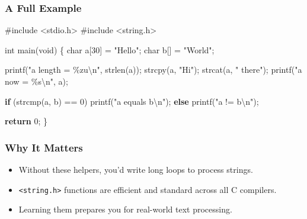 \documentclass[
  letterpaper,
  DIV=11,
  numbers=noendperiod]{scrreprt}
\newenvironment{Shaded}{\begin{snugshade}}{\end{snugshade}}
\newcommand{\ControlFlowTok}[1]{\textcolor[rgb]{0.00,0.23,0.31}{\textbf{#1}}}
\newcommand{\DataTypeTok}[1]{\textcolor[rgb]{0.68,0.00,0.00}{#1}}
\newcommand{\DecValTok}[1]{\textcolor[rgb]{0.68,0.00,0.00}{#1}}
\newcommand{\ImportTok}[1]{\textcolor[rgb]{0.00,0.46,0.62}{#1}}
\newcommand{\NormalTok}[1]{\textcolor[rgb]{0.00,0.23,0.31}{#1}}
\newcommand{\OperatorTok}[1]{\textcolor[rgb]{0.37,0.37,0.37}{#1}}
\newcommand{\PreprocessorTok}[1]{\textcolor[rgb]{0.68,0.00,0.00}{#1}}
\newcommand{\SpecialCharTok}[1]{\textcolor[rgb]{0.37,0.37,0.37}{#1}}
\newcommand{\StringTok}[1]{\textcolor[rgb]{0.13,0.47,0.30}{#1}}
\providecommand{\tightlist}{%
  \setlength{\itemsep}{0pt}\setlength{\parskip}{0pt}}
\begin{document}
\subsubsection{A Full Example}\label{a-full-example-12}

\begin{Shaded}
\begin{Highlighting}[]
\PreprocessorTok{\#include }\ImportTok{\textless{}stdio.h\textgreater{}}
\PreprocessorTok{\#include }\ImportTok{\textless{}string.h\textgreater{}}

\DataTypeTok{int}\NormalTok{ main}\OperatorTok{(}\DataTypeTok{void}\OperatorTok{)} \OperatorTok{\{}
    \DataTypeTok{char}\NormalTok{ a}\OperatorTok{[}\DecValTok{30}\OperatorTok{]} \OperatorTok{=} \StringTok{"Hello"}\OperatorTok{;}
    \DataTypeTok{char}\NormalTok{ b}\OperatorTok{[]} \OperatorTok{=} \StringTok{"World"}\OperatorTok{;}

\NormalTok{    printf}\OperatorTok{(}\StringTok{"a length = }\SpecialCharTok{\%zu\textbackslash{}n}\StringTok{"}\OperatorTok{,}\NormalTok{ strlen}\OperatorTok{(}\NormalTok{a}\OperatorTok{));}
\NormalTok{    strcpy}\OperatorTok{(}\NormalTok{a}\OperatorTok{,} \StringTok{"Hi"}\OperatorTok{);}
\NormalTok{    strcat}\OperatorTok{(}\NormalTok{a}\OperatorTok{,} \StringTok{" there"}\OperatorTok{);}
\NormalTok{    printf}\OperatorTok{(}\StringTok{"a now = }\SpecialCharTok{\%s\textbackslash{}n}\StringTok{"}\OperatorTok{,}\NormalTok{ a}\OperatorTok{);}

    \ControlFlowTok{if} \OperatorTok{(}\NormalTok{strcmp}\OperatorTok{(}\NormalTok{a}\OperatorTok{,}\NormalTok{ b}\OperatorTok{)} \OperatorTok{==} \DecValTok{0}\OperatorTok{)}
\NormalTok{        printf}\OperatorTok{(}\StringTok{"a equals b}\SpecialCharTok{\textbackslash{}n}\StringTok{"}\OperatorTok{);}
    \ControlFlowTok{else}
\NormalTok{        printf}\OperatorTok{(}\StringTok{"a != b}\SpecialCharTok{\textbackslash{}n}\StringTok{"}\OperatorTok{);}

    \ControlFlowTok{return} \DecValTok{0}\OperatorTok{;}
\OperatorTok{\}}
\end{Highlighting}
\end{Shaded}

\subsubsection{Why It Matters}\label{why-it-matters-27}

\begin{itemize}
\tightlist
\item
  Without these helpers, you'd write long loops to process strings.
\item
  \texttt{\textless{}string.h\textgreater{}} functions are efficient and
  standard across all C compilers.
\item
  Learning them prepares you for real-world text processing.
\end{itemize}
\end{document}
